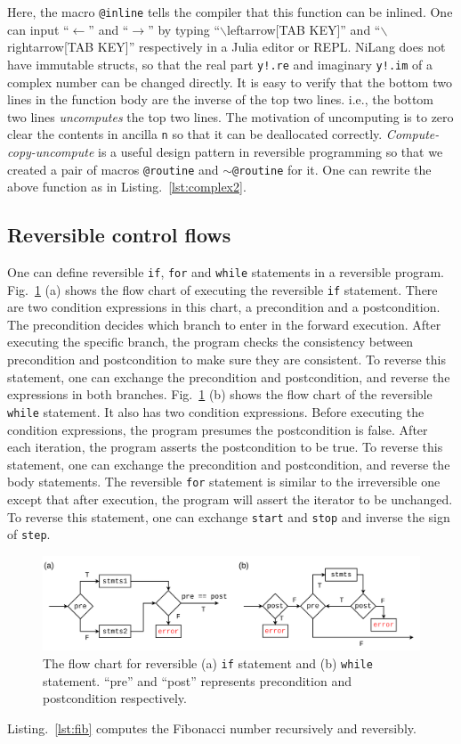 \documentclass{article}
\newcommand{\<}{\langle}
\renewcommand{\>}{\rangle}
\newcommand{\Fig}[1]{Fig.~\ref{#1}}
\newcommand{\Lst}[1]{Listing.~\ref{#1}}
\theoremstyle{definition}\newtheorem{definition}{\textit{Definition}}
\begin{document}
Here, the macro \texttt{@inline} tells the compiler that this function can be inlined. One can input ``$\leftarrow$'' and ``$\rightarrow$'' by typing ``$\backslash$leftarrow[TAB KEY]'' and ``$\backslash$rightarrow[TAB KEY]'' respectively in a Julia editor or REPL.
NiLang does not have immutable structs, so that the real part \texttt{y!.re} and imaginary \texttt{y!.im} of a complex number can be changed directly.
It is easy to verify that the bottom two lines in the function body are the inverse of the top two lines. i.e., the bottom two lines \textit{uncomputes} the top two lines.
The motivation of uncomputing is to zero clear the contents in ancilla \texttt{n} so that it can be deallocated correctly.
\textit{Compute-copy-uncompute} is a useful design pattern in reversible programming so that we created a pair of macros \texttt{@routine} and \texttt{$\sim$@routine} for it. One can rewrite the above function as in \Lst{lst:complex2}.

\subsection{Reversible control flows}
One can define reversible \texttt{if}, \texttt{for} and \texttt{while} statements in a reversible program.
\Fig{fig:controlflow} (a) shows the flow chart of executing the reversible \texttt{if} statement. There are two condition expressions in this chart, a precondition and a postcondition. The precondition decides which branch to enter in the forward execution. After executing the specific branch, the program checks the consistency between precondition and postcondition to make sure they are consistent. To reverse this statement, one can exchange the precondition and postcondition, and reverse the expressions in both branches.
\Fig{fig:controlflow} (b) shows the flow chart of the reversible \texttt{while} statement. It also has two condition expressions. Before executing the condition expressions, the program presumes the postcondition is false.
After each iteration, the program asserts the postcondition to be true. To reverse this statement, one can exchange the precondition and postcondition, and reverse the body statements.
The reversible \texttt{for} statement is similar to the irreversible one except that after execution, the program will assert the iterator to be unchanged. To reverse this statement, one can exchange \texttt{start} and \texttt{stop} and inverse the sign of \texttt{step}.
\begin{figure}
    \centerline{\includegraphics[width=0.9\columnwidth,trim={0 0cm 0 0cm},clip]{controlflow_v2.pdf}}
    \caption{The flow chart for reversible (a) \texttt{if} statement and (b) \texttt{while} statement. ``pre'' and ``post'' represents precondition and postcondition respectively.}\label{fig:controlflow}
\end{figure}
\Lst{lst:fib} computes the Fibonacci number recursively and reversibly.
\end{document}
